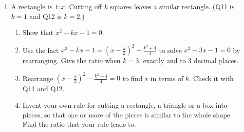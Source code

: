 \documentclass[11pt,a4paper]{article}
\begin{document}
\begin{enumerate}[resume]
\item A rectangle is $1:x$. Cutting off $k$ squares leaves a similar
rectangle. (Q11 is $k=1$ and Q12 is $k=2$.)
\begin{enumerate}
  \item Show that $x^2-kx-1=0$.
  \item Use the fact
        $x^2-kx-1=\left(x-\frac{k}{2}\right)^2-\frac{k^2+4}{4}$ to solve
        $x^2-3x-1=0$ by rearranging. Give the ratio when $k=3$, exactly and to
        3 decimal places.
  \item Rearrange $\left(x-\frac{k}{2}\right)^2-\frac{k^2+4}{4}=0$ to find
        $x$ in terms of $k$. Check it with Q11 and Q12.
  \item Invent your own rule for cutting a rectangle, a triangle or a box into
        pieces, so that one or more of the pieces is similar to the whole
        shape. Find the ratio that your rule leads to.
\end{enumerate}

\end{enumerate}
\end{document}
